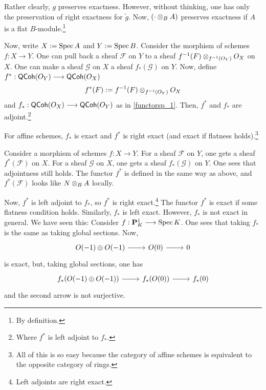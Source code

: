 \documentclass [11 pt, oneside] {article}
\begin{document}
Rather clearly, $g$ preserves exactness. However, without thinking, one has only the preservation of right exactness for $\tilde g$. Now, $(\cdot \otimes_B A)$ preserves exactness if $A$ is a flat $B$-module.\footnote{By definition.}

Now, write $X :=\operatorname{Spec} A$ and $Y:=\operatorname{Spec} B$. Consider the morphism of schemes $f:X\longrightarrow Y$. One can pull back a sheaf $\mathscr{F}$ on $Y$ to a sheaf $f^{-1}(\relax{F})\otimes_{f^{-1}(\relax{O}_Y)} \relax{O}_X$ on $X$. One can make a sheaf $\mathscr{G}$ on $X$ a sheaf $f_*(\mathscr{G})$ on $Y$. Now, define $f^* :\textsf{QCoh}(\relax{O}_Y)\longrightarrow \textsf{QCoh}(\relax{O}_X)$ 
\begin{align*}
	f^*(\relax{F}) := f^{-1}(\relax{F}) \otimes_{f^{-1}(\relax{O}_Y)} \relax{O}_X
\end{align*}
and $f_* : \textsf{QCoh}(\relax{O}_X)\longrightarrow \textsf{QCoh}(\relax{O}_Y)$ as in \cref{functorsp_1}. Then, $f^*$ and $f_*$ are adjoint.\footnote{Where $f^*$ is left adjoint to $f_*$.}

For affine schemes, $f_*$ is exact and $f^*$ is right exact (and exact if flatness holds).\footnote{All of this is so easy because the category of affine schemes is equivalent to the opposite category of rings.}

Consider a morphism of schemes $f:X\longrightarrow Y$. For a sheaf $\mathscr{F}$ on $Y$, one gets a sheaf $f^*(\mathscr{F})$ on $X$. For a sheaf $\mathscr{G}$ on $X$, one gets a sheaf $f_*(\mathscr{G})$ on $Y$. One sees that adjointness still holds. The functor $f^*$ is defined in the same way as above, and $f^*(\mathscr{F})$ looks like $N\otimes_B A$ locally.

Now, $f^*$ is left adjoint to $f_*$, so $f^*$ is right exact.\footnote{Left adjoints are right exact.} The functor $f^*$ is exact if some flatness condition holds. Similarly, $f_*$ is left exact. However, $f_*$ is not exact in general. We have seen this: Consider $f:\mathbf{P}^1_K\longrightarrow \operatorname{Spec} K$. One sees that taking $f_*$ is the same as taking global sections. Now, 
\[
\begin{tikzcd}
	\mathscr{O}(-1) \oplus \mathscr{O}(-1)\ar[r]& \mathscr{O}(0) \ar[r] & 0
\end{tikzcd}
\]
is exact, but, taking global sections, one has
\[
\begin{tikzcd}
 f_*(\mathscr{O}(-1) \oplus \mathscr{O}(-1))\ar[r]& f_*(\mathscr{O}(0)) \ar[r] & f_*(0)
\end{tikzcd}
\]
and the second arrow is not surjective.
\end{document}
